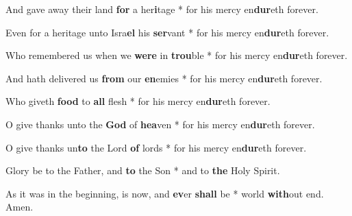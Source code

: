 \begin{multicols}{2}
	And gave away their land \textbf{for} a her\textbf{i}tage * for his mercy en\textbf{dur}eth forever.
	
	Even for a heritage unto Isra\textbf{el} his \textbf{ser}vant * for his mercy en\textbf{dur}eth forever.
	
	Who remembered us when we \textbf{were} in \textbf{trou}ble * for his mercy en\textbf{dur}eth forever.
	
	And hath delivered us \textbf{from} our \textbf{en}emies * for his mercy en\textbf{dur}eth forever.
	
	Who giveth \textbf{food} to \textbf{all} flesh * for his mercy en\textbf{dur}eth forever.
	
	O give thanks unto the \textbf{God} of \textbf{hea}ven * for his mercy en\textbf{dur}eth forever.
	
	O give thanks un\textbf{to} the Lord \textbf{of} lords * for his mercy en\textbf{dur}eth forever.
	
	Glory be to the Father, and \textbf{to} the Son * and to \textbf{the} Holy Spirit.
	
	As it was in the beginning, is now, and \textbf{ev}er \textbf{shall} be * world \textbf{with}out end. Amen.
\end{multicols}